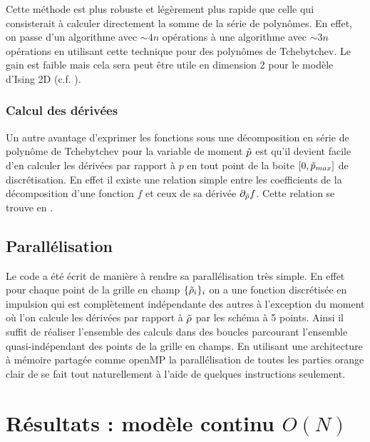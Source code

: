 \documentclass[10.5pt]{article}
\begin{document}
\begin{multicols*}{2}
Cette méthode \cite{clenshaw1955note} est plus robuste et légèrement plus rapide que celle qui consisterait à calculer directement la somme de la série de polynômes. En effet, on passe d'un algorithme avec $\sim 4n$ opérations à une algorithme avec $\sim 3n$ opérations en utilisant cette technique pour des polynômes de Tchebytchev. Le gain est faible mais cela sera peut être utile en dimension 2 pour le modèle d'Ising 2D (c.f. ). \\


\subsubsection{Calcul des dérivées}

Un autre avantage d'exprimer les fonctions sous une décomposition en série de polynôme de Tchebytchev pour la variable de moment $\tilde{p}$ est qu'il devient facile d'en calculer les dérivées par rapport à $p$ en tout point de la boite $[0, \tilde{p}_{max}]$ de discrétisation. En effet il existe une relation simple entre les coefficients de la décomposition d'une fonction $f$ et ceux de sa dérivée $\partial_{\tilde{p}} f$. Cette relation se trouve en . \\








\subsection{Parallélisation}


Le code a été écrit de manière à rendre sa parallélisation très simple. En effet pour chaque point de la grille en champ $\{\tilde{\rho}_i\}_i$ on a une fonction discrétisée en impulsion qui est complètement indépendante des autres à l'exception du moment où l'on calcule les dérivées par rapport à $\tilde{\rho}$ par les schéma à 5 points. Ainsi il suffit de réaliser l'ensemble des calculs dans des boucles parcourant l'ensemble quasi-indépendant des points de la grille en champs. En utilisant une architecture à mémoire partagée comme openMP \cite{openmp2002c++} la parallélisation de toutes les parties orange clair de  se fait tout naturellement à l'aide de quelques instructions seulement. 



\section{Résultats : modèle continu $O(N)$}


\end{multicols*}
\end{document}
